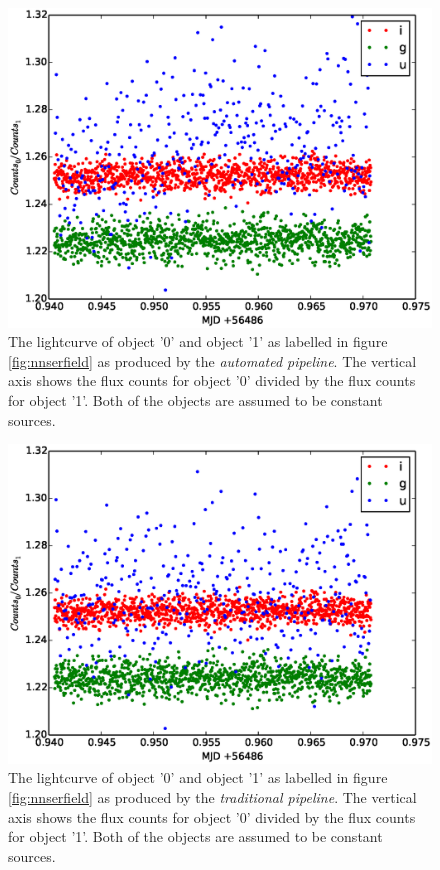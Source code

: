 \begin{figure}[!h]
\centering
\includegraphics[width=140mm]{images/differential_auto.eps}
\caption{The lightcurve of object '0' and object '1' as labelled in figure \ref{fig:nnserfield} as produced by the \emph{automated pipeline}. The vertical axis shows the flux counts for object '0' divided by the flux counts for object '1'. Both of the objects are assumed to be constant sources. }
\label{fig:differentialauto}
\end{figure}

\begin{figure}[!h]
\centering
\includegraphics[width=140mm]{images/differential_trad.eps}
\caption{The lightcurve of object '0' and object '1' as labelled in figure \ref{fig:nnserfield} as produced by the \emph{traditional pipeline}. The vertical axis shows the flux counts for object '0' divided by the flux counts for object '1'. Both of the objects are assumed to be constant sources. }
\label{fig:differentialtrad}
\end{figure}


